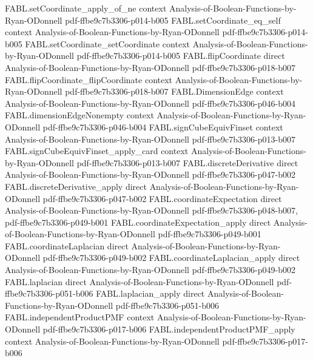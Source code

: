\begin{theorem}
  {FABL.setCoordinate_apply_of_ne}
  {context}
  {Analysis-of-Boolean-Functions-by-Ryan-ODonnell}
  {pdf-ffbe9c7b3306-p014-b005}
\proofstep
  {FABL.setCoordinate_eq_self}
  {context}
  {Analysis-of-Boolean-Functions-by-Ryan-ODonnell}
  {pdf-ffbe9c7b3306-p014-b005}
\proofstep
  {FABL.setCoordinate_setCoordinate}
  {context}
  {Analysis-of-Boolean-Functions-by-Ryan-ODonnell}
  {pdf-ffbe9c7b3306-p014-b005}
\proofstep
  {FABL.flipCoordinate}
  {direct}
  {Analysis-of-Boolean-Functions-by-Ryan-ODonnell}
  {pdf-ffbe9c7b3306-p018-b007}
\proofstep
  {FABL.flipCoordinate_flipCoordinate}
  {context}
  {Analysis-of-Boolean-Functions-by-Ryan-ODonnell}
  {pdf-ffbe9c7b3306-p018-b007}
\proofstep
  {FABL.DimensionEdge}
  {context}
  {Analysis-of-Boolean-Functions-by-Ryan-ODonnell}
  {pdf-ffbe9c7b3306-p046-b004}
\proofstep
  {FABL.dimensionEdgeNonempty}
  {context}
  {Analysis-of-Boolean-Functions-by-Ryan-ODonnell}
  {pdf-ffbe9c7b3306-p046-b004}
\proofstep
  {FABL.signCubeEquivFinset}
  {context}
  {Analysis-of-Boolean-Functions-by-Ryan-ODonnell}
  {pdf-ffbe9c7b3306-p013-b007}
\proofstep
  {FABL.signCubeEquivFinset_apply_card}
  {context}
  {Analysis-of-Boolean-Functions-by-Ryan-ODonnell}
  {pdf-ffbe9c7b3306-p013-b007}
\proofstep
  {FABL.discreteDerivative}
  {direct}
  {Analysis-of-Boolean-Functions-by-Ryan-ODonnell}
  {pdf-ffbe9c7b3306-p047-b002}
\proofstep
  {FABL.discreteDerivative_apply}
  {direct}
  {Analysis-of-Boolean-Functions-by-Ryan-ODonnell}
  {pdf-ffbe9c7b3306-p047-b002}
\proofstep
  {FABL.coordinateExpectation}
  {direct}
  {Analysis-of-Boolean-Functions-by-Ryan-ODonnell}
  {pdf-ffbe9c7b3306-p048-b007,
    pdf-ffbe9c7b3306-p049-b001}
\proofstep
  {FABL.coordinateExpectation_apply}
  {direct}
  {Analysis-of-Boolean-Functions-by-Ryan-ODonnell}
  {pdf-ffbe9c7b3306-p049-b001}
\proofstep
  {FABL.coordinateLaplacian}
  {direct}
  {Analysis-of-Boolean-Functions-by-Ryan-ODonnell}
  {pdf-ffbe9c7b3306-p049-b002}
\proofstep
  {FABL.coordinateLaplacian_apply}
  {direct}
  {Analysis-of-Boolean-Functions-by-Ryan-ODonnell}
  {pdf-ffbe9c7b3306-p049-b002}
\proofstep
  {FABL.laplacian}
  {direct}
  {Analysis-of-Boolean-Functions-by-Ryan-ODonnell}
  {pdf-ffbe9c7b3306-p051-b006}
\proofstep
  {FABL.laplacian_apply}
  {direct}
  {Analysis-of-Boolean-Functions-by-Ryan-ODonnell}
  {pdf-ffbe9c7b3306-p051-b006}
\proofstep
  {FABL.independentProductPMF}
  {context}
  {Analysis-of-Boolean-Functions-by-Ryan-ODonnell}
  {pdf-ffbe9c7b3306-p017-b006}
\proofstep
  {FABL.independentProductPMF_apply}
  {context}
  {Analysis-of-Boolean-Functions-by-Ryan-ODonnell}
  {pdf-ffbe9c7b3306-p017-b006}

\end{theorem}
